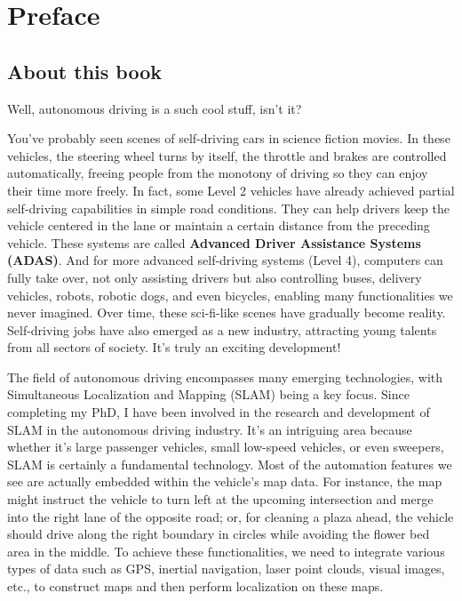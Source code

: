 \thispagestyle{empty}
\chapter*{Preface}
\thispagestyle{empty}
\section*{About this book}

Well, autonomous driving is a such cool stuff, isn't it? 

You've probably seen scenes of self-driving cars in science fiction movies. In these vehicles, the steering wheel turns by itself, the throttle and brakes are controlled automatically, freeing people from the monotony of driving so they can enjoy their time more freely. In fact, some Level 2 vehicles have already achieved partial self-driving capabilities in simple road conditions. They can help drivers keep the vehicle centered in the lane or maintain a certain distance from the preceding vehicle. These systems are called \textbf{Advanced Driver Assistance Systems (ADAS)}. And for more advanced self-driving systems (Level 4), computers can fully take over, not only assisting drivers but also controlling buses, delivery vehicles, robots, robotic dogs, and even bicycles, enabling many functionalities we never imagined. Over time, these sci-fi-like scenes have gradually become reality. Self-driving jobs have also emerged as a new industry, attracting young talents from all sectors of society. It's truly an exciting development!

The field of autonomous driving encompasses many emerging technologies, with Simultaneous Localization and Mapping (SLAM) being a key focus. Since completing my PhD, I have been involved in the research and development of SLAM in the autonomous driving industry. It's an intriguing area because whether it's large passenger vehicles, small low-speed vehicles, or even sweepers, SLAM is certainly a fundamental technology. Most of the automation features we see are actually embedded within the vehicle's map data. For instance, the map might instruct the vehicle to turn left at the upcoming intersection and merge into the right lane of the opposite road; or, for cleaning a plaza ahead, the vehicle should drive along the right boundary in circles while avoiding the flower bed area in the middle. To achieve these functionalities, we need to integrate various types of data such as GPS, inertial navigation, laser point clouds, visual images, etc., to construct maps and then perform localization on these maps.


